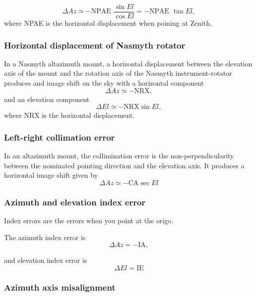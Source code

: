\begin{equation}
    \Delta Az \simeq - \text{NPAE } \frac{\sin{El}}{\cos{El}}= - \text{NPAE } \tan{El},
\end{equation}
where NPAE is the horizontal displacement when poining at Zenith.

\subsubsection{Horizontal displacement of Nasmyth rotator}
In a Nasmyth altazimuth mount, a horizontal displacement between the elevation axis of the mount and the rotation axis of the Nasmyth instrument-rotator produces
and image shift on the sky with a horizontal component
\begin{equation}
    \Delta Az \simeq - \text{NRX},
\end{equation}
and an elevation component
\begin{equation}
    \Delta El \simeq - \text{NRX} \sin{El},
\end{equation}
where NRX is the horizontal displacement.

\subsubsection{Left-right collimation error}
In an altazimuth mount, the collimination error is the non-perpendicularity between the nominated pointing direction and the elevation axis.
It produces a horizontal image shift given by
\begin{equation}
    \Delta Az \simeq -\text{CA} \sec{El}
\end{equation}


\subsubsection{Azimuth and elevation index error}
Index errors are the errors when you point at the origo.

The azimuth index error is 
\begin{equation}
    \Delta Az = -\text{IA},
\end{equation}

and elevation index error is
\begin{equation}
    \Delta El = \text{IE}
\end{equation}

\subsubsection{Azimuth axis misalignment} 

